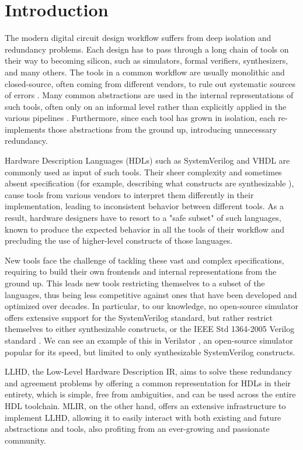 \chapter{Introduction}
\label{ch:intro}
The modern digital circuit design workflow suffers from deep isolation and redundancy problems. Each design has to pass through a long chain of tools on their way to becoming silicon, such as simulators, formal verifiers, synthesizers, and many others. The tools in a common workflow are usually monolithic and closed-source, often coming from different vendors, to rule out systematic sources of errors \cite{Schuiki2020}. Many common abstractions are used in the internal representations of such tools, often only on an informal level rather than explicitly applied in the various pipelines \cite{Neuendorffer}. Furthermore, since each tool has grown in isolation, each re-implements those abstractions from the ground up, introducing unnecessary redundancy.

Hardware Description Languages (HDLs) such as SystemVerilog \cite{SV2018} and VHDL \cite{VHDL2009} are commonly used as input of such tools. Their sheer complexity and sometimes absent specification (for example, describing what constructs are synthesizable \cite{Sutherland2006APF}), cause tools from various vendors to interpret them differently in their implementation, leading to inconsistent behavior between different tools. As a result, hardware designers have to resort to a "safe subset" of such languages, known to produce the expected behavior in all the tools of their workflow and precluding the use of higher-level constructs of those languages.

New tools face the challenge of tackling these vast and complex specifications, requiring to build their own frontends and internal representations from the ground up. This leads new tools restricting themselves to a subset of the languages, thus being less competitive against ones that have been developed and optimized over decades.
In particular, to our knowledge, no open-source simulator offers extensive support for the SystemVerilog standard, but rather restrict themselves to either synthesizable constructs, or the IEEE Std 1364-2005 Verilog standard \cite{V2006}. We can see an example of this in Verilator \cite{verilator}, an open-source simulator popular for its speed, but limited to only synthesizable SystemVerilog constructs.

LLHD, the Low-Level Hardware Description IR, aims to solve these redundancy and agreement problems by offering a common representation for HDLs in their entirety, which is simple, free from ambiguities, and can be used across the entire HDL toolchain. MLIR, on the other hand, offers an extensive infrastructure to implement LLHD, allowing it to easily interact with both existing and future abstractions and tools, also profiting from an ever-growing and passionate community.

